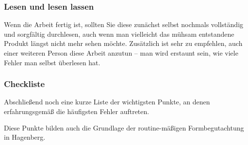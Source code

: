 \hypertarget{lesen-und-lesen-lassen}{%
\subsubsection{Lesen und lesen lassen}\label{lesen-und-lesen-lassen}}

Wenn die Arbeit fertig ist, sollten Sie diese zunächst selbst nochmals
vollständig und sorgfältig durchlesen, auch wenn man vielleicht das
mühsam entstandene Produkt längst nicht mehr sehen möchte. Zusätzlich
ist sehr zu empfehlen, auch einer weiteren Person diese Arbeit anzutun
-- man wird erstaunt sein, wie viele Fehler man selbst überlesen hat.

\hypertarget{checkliste}{%
\subsubsection{Checkliste}\label{checkliste}}

Abschließend noch eine kurze Liste der wichtigsten Punkte, an denen
erfahrungsgemäß die häufigsten Fehler auftreten.

Diese Punkte bilden auch die Grundlage der routine-mäßigen
Formbegutachtung in Hagenberg.

